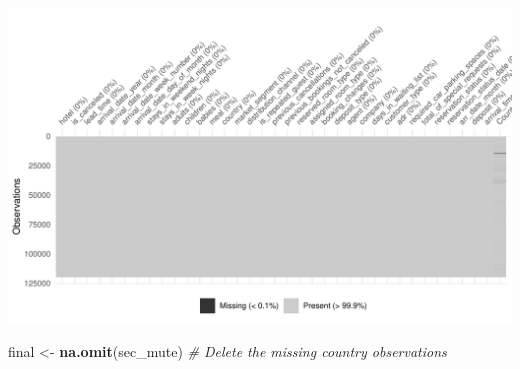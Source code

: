 \documentclass[11pt,a4paper,]{article}
\newenvironment{Shaded}{\begin{snugshade}}{\end{snugshade}}
\newcommand{\CommentTok}[1]{\textcolor[rgb]{0.56,0.35,0.01}{\textit{#1}}}
\newcommand{\KeywordTok}[1]{\textcolor[rgb]{0.13,0.29,0.53}{\textbf{#1}}}
\newcommand{\NormalTok}[1]{#1}
\newcommand{\OperatorTok}[1]{\textcolor[rgb]{0.81,0.36,0.00}{\textbf{#1}}}
\newcommand{\StringTok}[1]{\textcolor[rgb]{0.31,0.60,0.02}{#1}}
\begin{document}
\includegraphics{tidy_files/figure-latex/secfinal-1.pdf}

\begin{Shaded}
\end{Shaded}

\begin{Shaded}
\begin{Highlighting}[]
\NormalTok{final <-}\StringTok{ }\KeywordTok{na.omit}\NormalTok{(sec_mute)  }\CommentTok{# Delete the missing country observations}
\end{Highlighting}
\end{Shaded}
\end{document}
